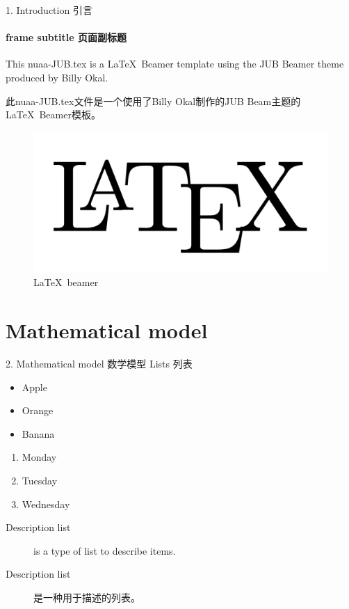 \documentclass{beamer}
\begin{document}
\begin{frame}{1. Introduction 引言}
	\framesubtitle{frame subtitle 页面副标题}
	This nuaa-JUB.tex is a \LaTeX \ Beamer template using the JUB Beamer theme  produced by Billy Okal.
	
	\bigskip
	
	此nuaa-JUB.tex文件是一个使用了Billy Okal制作的JUB Beam主题的\LaTeX \ Beamer模板。
	
	\begin{figure}
		\begin{center}
			\includegraphics[scale=0.1]{latex.png}
		\end{center}
		\caption{\LaTeX \ beamer}
		\label{Fig:latex_beamer}
	\end{figure}
\end{frame} %

\section{Mathematical model}
\label{Sec:model}
\begin{frame}{2. Mathematical model 数学模型}
	Lists 列表
	
	\begin{itemize}
		\item Apple
		\item Orange
		\item Banana
	\end{itemize}
	
	\begin{enumerate}
		\item Monday
		\item Tuesday
		\item Wednesday
	\end{enumerate}
	
	\begin{description}
		\item[Description list] is a type of list to describe items.
		\item[Description list] 是一种用于描述的列表。
	\end{description}
\end{frame} 
\end{document}
